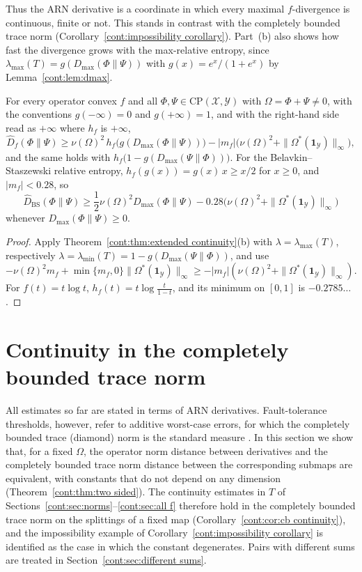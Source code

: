 Thus the ARN derivative is a coordinate in which every maximal $f$-divergence is continuous, finite or not. This stands in contrast with the completely bounded trace norm (Corollary~\ref{cont:impossibility corollary}). Part~(b) also shows how fast the divergence grows with the max-relative entropy, since $\lambda_{\max}(T)=g(D_{\max}(\Phi\|\Psi))$ with $g(x)=e^x/(1+e^x)$ by Lemma~\ref{cont:lem:dmax}.

\begin{corollary}\label{cont:cor:dmax growth}
For every operator convex $f$ and all $\Phi,\Psi\in\mathrm{CP}(\mathcal{X},\mathcal{Y})$ with $\Omega=\Phi+\Psi\neq0$, with the conventions $g(-\infty)=0$ and $g(+\infty)=1$, and with the right-hand side read as $+\infty$ where $h_f$ is $+\infty$,
\[
\widehat{D}_f(\Phi\|\Psi)\geq\nu(\Omega)^2\,h_f\big(g(D_{\max}(\Phi\|\Psi))\big)-|m_f|\big(\nu(\Omega)^2+\|\Omega^*(\mathbf{1}_{\mathcal{Y}})\|_\infty\big),
\]
and the same holds with $h_f\big(1-g(D_{\max}(\Psi\|\Phi))\big)$. For the Belavkin--Staszewski relative entropy, $h_f(g(x))=g(x)\,x\geq x/2$ for $x\geq0$, and $|m_f|<0.28$, so
\[
\widehat{D}_{\mathrm{BS}}(\Phi\|\Psi)\geq\frac12\nu(\Omega)^2D_{\max}(\Phi\|\Psi)-0.28\big(\nu(\Omega)^2+\|\Omega^*(\mathbf{1}_{\mathcal{Y}})\|_\infty\big)
\]
whenever $D_{\max}(\Phi\|\Psi)\geq0$.
\end{corollary}

\begin{proof}
Apply Theorem~\ref{cont:thm:extended continuity}(b) with $\lambda=\lambda_{\max}(T)$, respectively $\lambda=\lambda_{\min}(T)=1-g(D_{\max}(\Psi\|\Phi))$, and use
\[
-\nu(\Omega)^2m_f+\min\{m_f,0\}\|\Omega^*(\mathbf{1}_{\mathcal{Y}})\|_\infty\geq-|m_f|(\nu(\Omega)^2+\|\Omega^*(\mathbf{1}_{\mathcal{Y}})\|_\infty).
\]
For $f(t)=t\log t$, $h_f(t)=t\log\frac{t}{1-t}$, and its minimum on $[0,1]$ is $-0.2785\ldots$.
\end{proof}

\section{Continuity in the completely bounded trace norm}\label{cont:sec:four maps}

All estimates so far are stated in terms of ARN derivatives. Fault-tolerance thresholds, however, refer to additive worst-case errors, for which the completely bounded trace (diamond) norm is the standard measure \cite{KuengLongDohertyFlammia2016}. In this section we show that, for a fixed $\Omega$, the operator norm distance between derivatives and the completely bounded trace norm distance between the corresponding submaps are equivalent, with constants that do not depend on any dimension (Theorem~\ref{cont:thm:two sided}). The continuity estimates in $T$ of Sections~\ref{cont:sec:norms}--\ref{cont:sec:all f} therefore hold in the completely bounded trace norm on the splittings of a fixed map (Corollary~\ref{cont:cor:cb continuity}), and the impossibility example of Corollary~\ref{cont:impossibility corollary} is identified as the case in which the constant degenerates. Pairs with different sums are treated in Section~\ref{cont:sec:different sums}.

